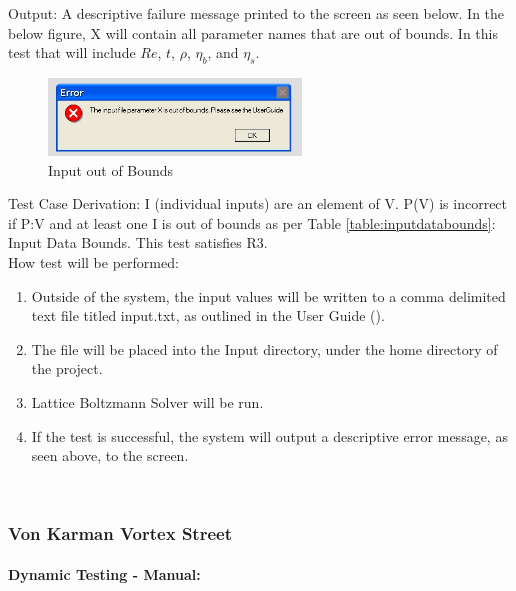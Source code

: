 \documentclass[12pt, titlepage]{article}
\newcommand{\famname}{Lattice Boltzmann Solver}
\begin{document}
\begin{enumerate}
Output: A descriptive failure message printed to the screen as seen below. In the below figure, X will contain all parameter names that are out of bounds. In this test that will include $Re$, $t$, $\rho$, $\eta_b$, and $\eta_s$.

\begin{figure}[h!]
	\begin{center}
		\includegraphics[width=0.6\textwidth]{errorMessage.jpeg}
		\caption{Input out of Bounds}
		\label{Fig_InputError}
	\end{center}
\end{figure}

Test Case Derivation: 
I (individual inputs) are an element of V. P(V) is incorrect if P:V and at least one I is out of bounds as per Table \ref{table:inputdatabounds}: Input Data Bounds. This test satisfies R3.\\ 


How test will be performed: 

\begin{enumerate}
	\item Outside of the system, the input values will be written to a comma delimited text file titled input.txt, as outlined in the User Guide (\citet{LBM_UserGuide_PM}).
	\item The file will be placed into the Input directory, under the home directory of the project.
	\item {\famname} will be run.
	\item If the test is successful, the system will output a descriptive error message, as seen above, to the screen.\\
	
	
\end{enumerate}

\end{enumerate}

~\newpage

\subsubsection{Von Karman Vortex Street}
\label{frvkvs}
		
\paragraph{Dynamic Testing - Manual:}
\end{document}
